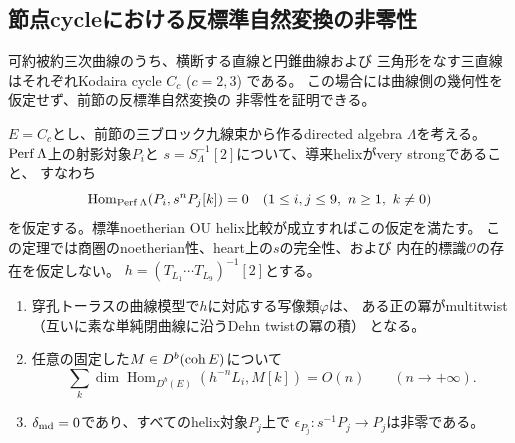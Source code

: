 \subsection{節点cycleにおける反標準自然変換の非零性}
\label{subsec:ou-nodal-cycle-growth}
可約被約三次曲線のうち、横断する直線と円錐曲線および
三角形をなす三直線はそれぞれKodaira cycle $C_c$ ($c=2,3$) である。
この場合には曲線側の幾何性を仮定せず、前節の反標準自然変換の
非零性を証明できる。

\begin{theorem}[節点cycleの線形成長と反標準写像]
\label{thm:ou-nodal-cycle-growth}
$E=C_c$とし、前節の三ブロック九線束から作るdirected algebra
$\Lambda$を考える。$\operatorname{Perf}\Lambda$上の射影対象$P_i$と
$s=S_\Lambda^{-1}[2]$について、導来helixがvery strongであること、
すなわち
\begin{equation}\label{eq:ou-derived-very-strong}
 \operatorname{Hom}_{\operatorname{Perf}\Lambda}(P_i,s^nP_j[k])=0
 \quad (1\leq i,j\leq9,\ n\geq1,\ k\ne0)
\end{equation}
を仮定する。標準noetherian OU helix比較が成立すればこの仮定を満たす。
この定理では商圏のnoetherian性、heart上の$s$の完全性、および
内在的標識$\mathcal O$の存在を仮定しない。
$h=(T_{L_1}\cdots T_{L_9})^{-1}[2]$とする。
\begin{enumerate}[label=(\roman*)]
\item 穿孔トーラスの曲線模型で$h$に対応する写像類$\varphi$は、
ある正の冪がmultitwist（互いに素な単純閉曲線に沿うDehn twistの冪の積）
となる。
\item 任意の固定した$M\in D^b(\operatorname{coh} E)$について
\[
 \sum_k\dim\operatorname{Hom}_{D^b(E)}(h^{-n}L_i,M[k])=O(n)
 \qquad(n\to+\infty).
\]
\item $\delta_{\rm md}=0$であり、すべてのhelix対象$P_j$上で
$\epsilon_{P_j}:s^{-1}P_j\to P_j$は非零である。
\end{enumerate}
\end{theorem}

